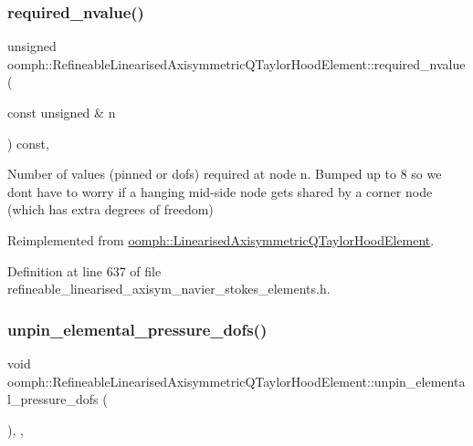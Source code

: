 \subsubsection{\texorpdfstring{required\+\_\+nvalue()}{required\_nvalue()}}
{\footnotesize\ttfamily unsigned oomph\+::\+Refineable\+Linearised\+Axisymmetric\+Q\+Taylor\+Hood\+Element\+::required\+\_\+nvalue (\begin{DoxyParamCaption}\item[{const unsigned \&}]{n }\end{DoxyParamCaption}) const\hspace{0.3cm}{\ttfamily [inline]}, {\ttfamily [virtual]}}



Number of values (pinned or dofs) required at node n. Bumped up to 8 so we don\textquotesingle{}t have to worry if a hanging mid-\/side node gets shared by a corner node (which has extra degrees of freedom) 



Reimplemented from \hyperlink{classoomph_1_1LinearisedAxisymmetricQTaylorHoodElement_a4c7623e7e58ee1381789a1ac98a5a7d2}{oomph\+::\+Linearised\+Axisymmetric\+Q\+Taylor\+Hood\+Element}.



Definition at line 637 of file refineable\+\_\+linearised\+\_\+axisym\+\_\+navier\+\_\+stokes\+\_\+elements.\+h.

\mbox{\label{classoomph_1_1RefineableLinearisedAxisymmetricQTaylorHoodElement_a89fd645f3c0f8349767947573c48252c}} 
\subsubsection{\texorpdfstring{unpin\+\_\+elemental\+\_\+pressure\+\_\+dofs()}{unpin\_elemental\_pressure\_dofs()}}
{\footnotesize\ttfamily void oomph\+::\+Refineable\+Linearised\+Axisymmetric\+Q\+Taylor\+Hood\+Element\+::unpin\+\_\+elemental\+\_\+pressure\+\_\+dofs (\begin{DoxyParamCaption}{ }\end{DoxyParamCaption})\hspace{0.3cm}{\ttfamily [inline]}, {\ttfamily [private]}, {\ttfamily [virtual]}}



